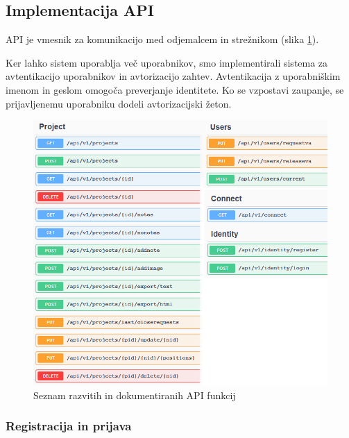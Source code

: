 \documentclass[a4paper, 12pt]{book}
\begin{document}
\subsection{Implementacija API}

API je vmesnik za komunikacijo med odjemalcem in strežnikom (slika \ref{api_routes}).

Ker lahko sistem uporablja več uporabnikov, smo implementirali sistema za avtentikacijo uporabnikov in avtorizacijo zahtev.
Avtentikacija z uporabniškim imenom in geslom omogoča preverjanje identitete.
Ko se vzpostavi zaupanje, se prijavljenemu uporabniku dodeli avtorizacijski žeton.


\begin{figure}[H]
\begin{center}
\includegraphics[width=13.5cm]{api_routes_small}
\end{center}
\caption{Seznam razvitih in dokumentiranih API funkcij}
\label{api_routes}
\end{figure}

\subsubsection{Registracija in prijava}
\end{document}
